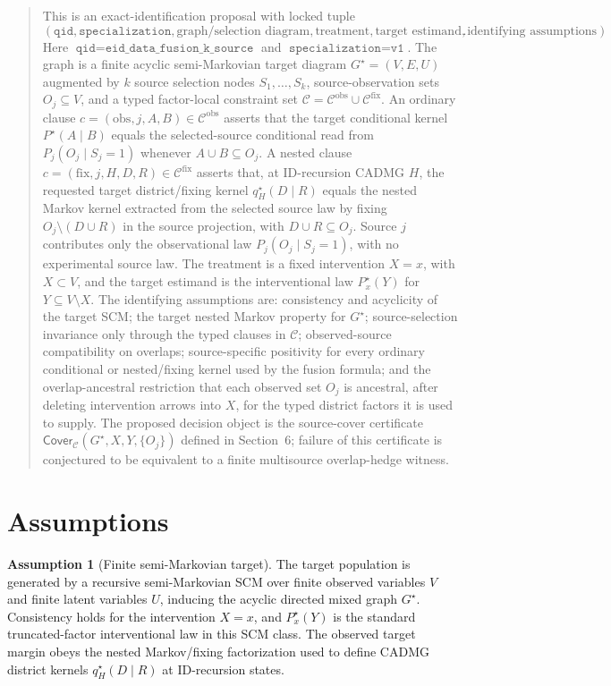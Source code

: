 \documentclass[11pt]{article}
\theoremstyle{definition}
\newtheorem{assumption}{Assumption}
\theoremstyle{plain}
\theoremstyle{remark}
\begin{document}
\begin{quote}
This is an exact-identification proposal with locked tuple
\[
(\texttt{qid},\texttt{specialization},\text{graph/selection diagram},
\text{treatment},\text{target estimand},\text{identifying assumptions}).
\]
Here \(\texttt{qid}=\texttt{eid\_data\_fusion\_k\_source}\) and
\(\texttt{specialization}=\texttt{v1}\).  The graph is a finite acyclic
semi-Markovian target diagram \(G^\star=(V,E,U)\) augmented by \(k\) source
selection nodes \(S_1,\ldots,S_k\), source-observation sets
\(O_j\subseteq V\), and a typed factor-local constraint set
\(\mathcal C=\mathcal C^{\mathrm{obs}}\cup\mathcal C^{\mathrm{fix}}\).
An ordinary clause \(c=(\mathrm{obs},j,A,B)\in\mathcal C^{\mathrm{obs}}\)
asserts that the target conditional kernel \(P^\star(A\mid B)\) equals the
selected-source conditional read from \(P_j(O_j\mid S_j=1)\) whenever
\(A\cup B\subseteq O_j\).  A nested clause
\(c=(\mathrm{fix},j,H,D,R)\in\mathcal C^{\mathrm{fix}}\) asserts that, at
ID-recursion CADMG \(H\), the requested target district/fixing kernel
\(q^\star_H(D\mid R)\) equals the nested Markov kernel extracted from the
selected source law by fixing \(O_j\setminus(D\cup R)\) in the source
projection, with \(D\cup R\subseteq O_j\).  Source \(j\) contributes only the observational law
\(P_j(O_j\mid S_j=1)\), with no experimental source law.  The treatment is a
fixed intervention \(X=x\), with \(X\subset V\), and the target estimand is
the interventional law \(P^\star_x(Y)\) for \(Y\subseteq V\setminus X\).
The identifying assumptions are: consistency and acyclicity of the target
SCM; the target nested Markov property for \(G^\star\); source-selection
invariance only through the typed clauses in \(\mathcal C\);
observed-source compatibility on overlaps; source-specific positivity for
every ordinary conditional or nested/fixing kernel used by the fusion
formula; and the overlap-ancestral restriction that each observed set
\(O_j\) is ancestral, after deleting intervention arrows into \(X\), for the
typed district factors it is used to supply.  The proposed decision object is the
source-cover certificate \(\mathsf{Cover}_{\mathcal C}(G^\star,X,Y,\{O_j\})\)
defined in Section~6; failure of this certificate is conjectured to be
equivalent to a finite multisource overlap-hedge witness.
\end{quote}

\section{Assumptions}
\begin{assumption}[Finite semi-Markovian target]\label{ass:finite-sm}
The target population is generated by a recursive semi-Markovian SCM over
finite observed variables \(V\) and finite latent variables \(U\), inducing
the acyclic directed mixed graph \(G^\star\).  Consistency holds for the
intervention \(X=x\), and \(P^\star_x(Y)\) is the standard truncated-factor
interventional law in this SCM class.  The observed target margin obeys the
nested Markov/fixing factorization used to define CADMG district kernels
\(q^\star_H(D\mid R)\) at ID-recursion states.
\end{assumption}
\end{document}
